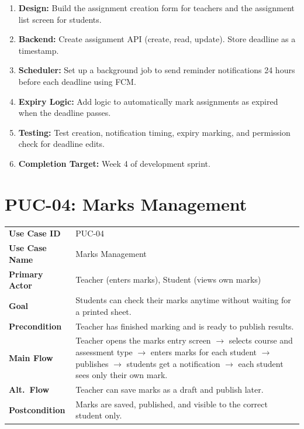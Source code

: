 \documentclass[12pt,a4paper]{article}
\begin{document}
\begin{tcolorbox}[planbox, title={Completion Plan --- PUC-03}]
\begin{enumerate}[leftmargin=*, label=\textbf{Step \arabic*:}, itemsep=4pt]
  \item \textbf{Design:} Build the assignment creation form for teachers and the assignment list screen for students.
  \item \textbf{Backend:} Create assignment API (create, read, update). Store deadline as a timestamp.
  \item \textbf{Scheduler:} Set up a background job to send reminder notifications 24 hours before each deadline using FCM.
  \item \textbf{Expiry Logic:} Add logic to automatically mark assignments as expired when the deadline passes.
  \item \textbf{Testing:} Test creation, notification timing, expiry marking, and permission check for deadline edits.
  \item \textbf{Completion Target:} Week 4 of development sprint.
\end{enumerate}
\end{tcolorbox}

\newpage
\section{PUC-04: Marks Management}

\begin{tcolorbox}[pucbox, title={Product Use Case --- PUC-04}]
\begin{tabularx}{\linewidth}{p{3.5cm} X}
\textbf{Use Case ID}    & PUC-04 \\
\textbf{Use Case Name}  & Marks Management \\
\textbf{Primary Actor}  & Teacher (enters marks), Student (views own marks) \\
\textbf{Goal}           & Students can check their marks anytime without waiting for a printed sheet. \\
\textbf{Precondition}   & Teacher has finished marking and is ready to publish results. \\
\textbf{Main Flow}      & Teacher opens the marks entry screen $\rightarrow$ selects course and assessment type $\rightarrow$ enters marks for each student $\rightarrow$ publishes $\rightarrow$ students get a notification $\rightarrow$ each student sees only their own mark. \\
\textbf{Alt.\ Flow}     & Teacher can save marks as a draft and publish later. \\
\textbf{Postcondition}  & Marks are saved, published, and visible to the correct student only. \\
\end{tabularx}
\end{tcolorbox}
\end{document}
